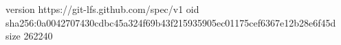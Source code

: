 version https://git-lfs.github.com/spec/v1
oid sha256:0a0042707430cdbc45a324f69b43f215935905ec01175cef6367e12b28e6f45d
size 262240
